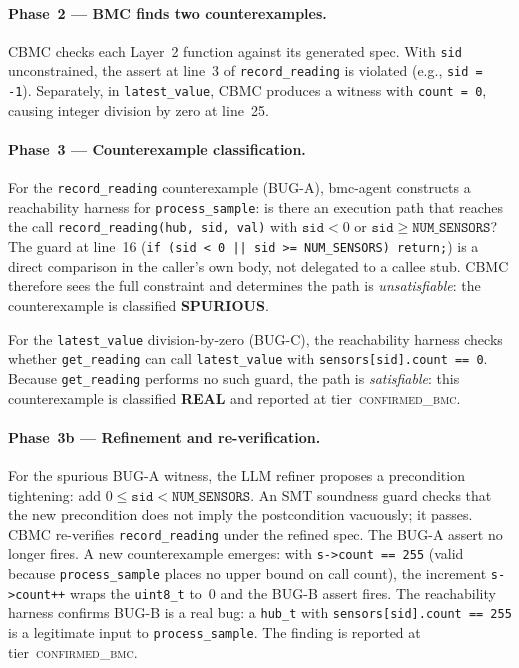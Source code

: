 \documentclass[11pt,a4paper]{article}
\newcommand{\tool}{bmc-agent\xspace}
\newcommand{\bmcconf}{\textsc{confirmed\_bmc}\xspace}
\begin{document}
\paragraph{Phase~2 --- BMC finds two counterexamples.}
CBMC checks each Layer~2 function against its generated spec.  With \texttt{sid}
unconstrained, the assert at line~3 of \texttt{record\_reading} is violated
(e.g., \texttt{sid = -1}).  Separately, in \texttt{latest\_value}, CBMC
produces a witness with \texttt{count = 0}, causing integer division by zero
at line~25.

\paragraph{Phase~3 --- Counterexample classification.}
For the \texttt{record\_reading} counterexample (BUG-A), \tool constructs a
reachability harness for \texttt{process\_sample}: is there an execution path
that reaches the call \texttt{record\_reading(hub, sid, val)} with
$\mathtt{sid} < 0$ or $\mathtt{sid} \geq \texttt{NUM\_SENSORS}$?
The guard at line~16 (\texttt{if (sid < 0 || sid >= NUM\_SENSORS) return;})
is a direct comparison in the caller's own body, not delegated to a callee
stub.  CBMC therefore sees the full constraint and determines the path is
\emph{unsatisfiable}: the counterexample is classified \textbf{SPURIOUS}.

For the \texttt{latest\_value} division-by-zero (BUG-C), the reachability
harness checks whether \texttt{get\_reading} can call \texttt{latest\_value}
with \texttt{sensors[sid].count == 0}.  Because \texttt{get\_reading} performs
no such guard, the path is \emph{satisfiable}: this counterexample is
classified \textbf{REAL} and reported at tier~\bmcconf.

\paragraph{Phase~3b --- Refinement and re-verification.}
For the spurious BUG-A witness, the LLM refiner proposes a precondition
tightening: add $0 \leq \mathtt{sid} < \texttt{NUM\_SENSORS}$.
An SMT soundness guard checks that the new precondition does not imply
the postcondition vacuously; it passes.
CBMC re-verifies \texttt{record\_reading} under the refined spec.
The BUG-A assert no longer fires.  A new counterexample emerges: with
\texttt{s->count == 255} (valid because \texttt{process\_sample} places no
upper bound on call count), the increment \texttt{s->count++} wraps the
\texttt{uint8\_t} to~0 and the BUG-B assert fires.
The reachability harness confirms BUG-B is a real bug: a \texttt{hub\_t}
with \texttt{sensors[sid].count == 255} is a legitimate input to
\texttt{process\_sample}.  The finding is reported at tier~\bmcconf.
\end{document}
